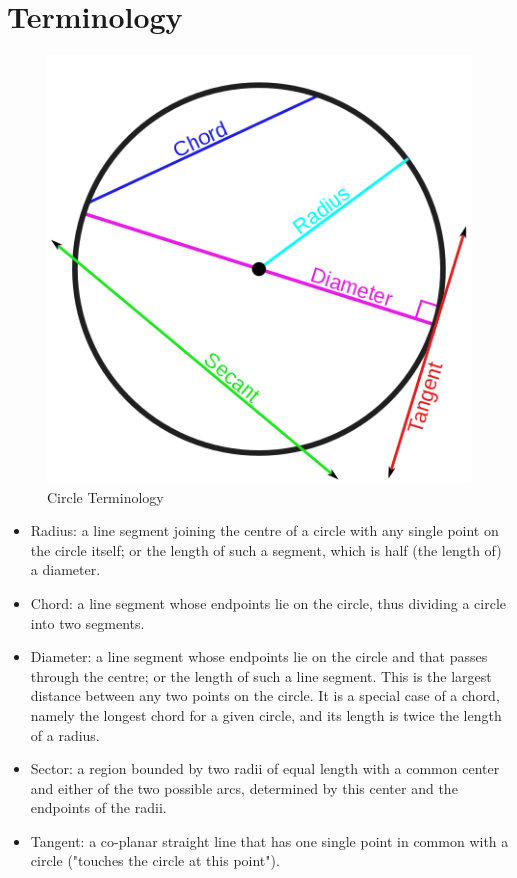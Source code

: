 \documentclass{article}
\begin{document}
\section{Terminology}
\begin{figure}[H]
    \centering
    \includegraphics[scale=0.5]{CIRCLE_LINES.png}
    \caption{Circle Terminology}
\end{figure}
\begin{itemize}
    \item Radius: a line segment joining the centre of a circle with any single point on the circle itself; or the length of such a segment, which is half (the length of) a diameter.
    \item Chord: a line segment whose endpoints lie on the circle, thus dividing a circle into two segments.
    \item Diameter: a line segment whose endpoints lie on the circle and that passes through the centre; or the length of such a line segment. This is the largest distance between any two points on the circle. It is a special case of a chord, namely the longest chord for a given circle, and its length is twice the length of a radius.
    \item Sector: a region bounded by two radii of equal length with a common center and either of the two possible arcs, determined by this center and the endpoints of the radii.
    \item Tangent: a co-planar straight line that has one single point in common with a circle ("touches the circle at this point").
\end{itemize}
\end{document}
